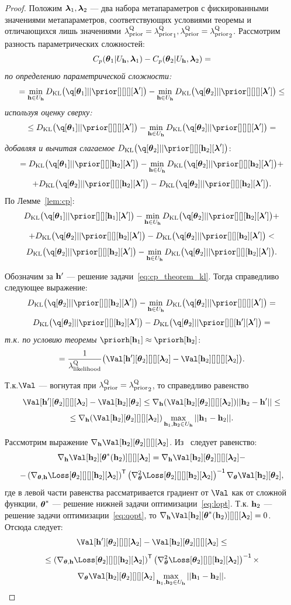 \begin{proof}
Положим $\boldsymbol{\lambda}_1, \boldsymbol{\lambda}_2$ --- два набора метапараметров с фискированными значениями метапараметров, соответствующих условиями теоремы и отличающихся лишь значениями $\lambda_\text{prior}^\text{Q} = {\lambda_\text{prior}^\text{Q}}_1, \lambda_\text{prior}^\text{Q} =  {\lambda_\text{prior}^\text{Q}}_2$.
Рассмотрим разность параметрических сложностей:
\[
    C_p(\boldsymbol{\theta}_1|U_{\mathbf{h}}, \boldsymbol{\lambda}_1) - C_p(\boldsymbol{\theta}_2|U_{\mathbf{h}}, \boldsymbol{\lambda}_2) =
\]
\textit{по определению параметрической сложности:}
\[
= \min_{\h \in \Uh} \KL{\q[\teta_1]}{\prior[][][][\lam']} -  \min_{\h \in \Uh} \KL{\q[\teta_2]}{\prior[][][][\lam']} \leq
\]
\textit{используя оценку сверху:}
\[
 \leq \KL{\q[\teta_1]}{\prior[][][][\lam']} -   \min_{\h \in \Uh} \KL{\q[\teta_2]}{\prior[][][][\lam']} = 
\]
\textit{добавляя и вычитая слагаемое }$\KL{\q[\teta_2]}{\prior[][][\h_2][\lam']}$:
\[
  = \KL{\q[\teta_1]}{\prior[][][\h_2][\lam']} -   \min_{\h \in \Uh} \KL{\q[\teta_2]}{\prior[][][\h_2][\lam']} + 
\]
\[
+  \KL{\q[\teta_2]}{\prior[][][\h_2][\lam']} -   \KL{\q[\teta_2]}{\prior[][][\h_2][\lam']}. 
\]
По Лемме~\ref{lem:cp}:
\[
   \KL{\q[\teta_1]}{\prior[][][\h_1][\lam']} -   \min_{\h \in \Uh} \KL{\q[\teta_2]}{\prior[][][\h_2][\lam']} + 
\]
\[
+  \KL{\q[\teta_2]}{\prior[][][\h_2][\lam']} -   \KL{\q[\teta_2]}{\prior[][][\h_2][\lam']} <
\]
\[
    \KL{\q[\teta_2]}{\prior[][][\h_2][\lam']} -   \min_{\h \in \Uh} \KL{\q[\teta_2]}{\prior[][][\h_2][\lam']}.
\]

Обозначим за $\mathbf{h}'$ --- решение задачи~\eqref{eq:cp_theorem_kl}.
Тогда справедливо следующее выражение:
\[
     \KL{\q[\teta_2]}{\prior[][][\h_2][\lam']} -   \min_{\h \in \Uh} \KL{\q[\teta_2]}{\prior[][][][\lam']}  = 
\]
\[
    \KL{\q[\teta_2]}{\prior[][][\h_2][\lam']} -   \KL{\q[\teta_2]}{\prior[][][\h'][\lam']} = 
\]
\textit{т.к. по условию теоремы } $\priorh[\h_1] \approx \priorh[\h_2]$:
\[
  = \frac{1}{\lamLL}\bigl(\Val[\h'][\teta_2][][][\lam_2] -  \Val[\h_2][][][][\lam_2]\bigr).
\]

Т.к.$\Val$ --- вогнутая при $\lambda_\text{prior}^\text{Q}  = {\lambda_\text{prior}^\text{Q}}_2$, то справедливо равенство
\[
 \Val[\h'][\teta_2][][][\lam_2] -  \Val[\h_2][\teta_2] \leq \nabla_{\h} (\Val[\h_2][\teta_2][][][\lam_2]) ||\h_2 - \h'||  \leq
\]
\[
\leq \nabla_{\h} (\Val[\h_2][\teta_2][][][\lam_2]) \max_{\h_1, \h_2 \in \Uh} ||\h_1 - \h_2||.
\]


Рассмотрим выражение $\nabla_{\h} \Val[\h_2][\teta_2][][][\lam_2]$. Из~\cite{hyper_hoag} следует равенство:
\[
    \nabla_{\h} \Val[\h_2][\teta^{*}(\h_2)][][][\lam_2]  = \nabla_{\h} \Val[\h_2][\teta_2][][][\lam_2] -
\]
\[
-  \left(\nabla_{\teta, \h} {\Loss[\teta_2][][][\h_2][\lam_2]}\right)^\mathsf{T} \left(\nabla_{\teta}^2 {\Loss[\teta_2][][][\h_2][\lam_2]}\right)^\mathsf{-1} \nabla_{\teta}\Val[\h_2][\teta_2],
\]
где в левой части равенства рассматривается градиент от $\Val$ как от сложной функции,  $\boldsymbol{\theta}^{*}$ --- решение нижней задачи оптимизации~\eqref{eq:lopt}.
Т.к. $\mathbf{h}_2$ --- решение задачи оптимизации~\eqref{eq:qopt}, то $\nabla_{\h} \Val[\h_2][\teta^{*}(\h_2)][][][\lam_2] = 0$.
Отсюда следует:
\[
     \Val[\h'][\teta_2][][][\lam_2] -  \Val[\h_2][\teta_2][][][\lam_2] \leq
\]
\[\leq  \left( \nabla_{\teta, \h} \Loss[\teta_2][][][\h_2][\lam_2]\right)^\mathsf{T} \left(\nabla_{\teta}^2 \Loss[\teta_2][][][\h_2][\lam_2]\right)^\mathsf{-1} \times
\]
\[
 \nabla_{\teta}\Val[\h_2][\teta_2][][][\lam_2] \max_{\h_1, \h_2 \in \Uh} ||\h_1 - \h_2||.
\]


\end{proof}
